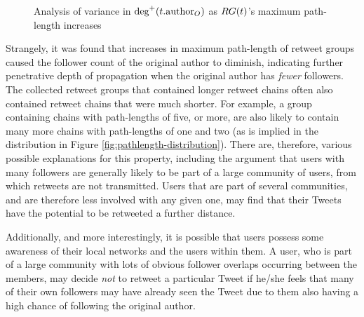 \begin{figure}[h]
\centering
    \caption{Analysis of variance in $\textrm{deg}^+(t.\textrm{author}_O)$ as $RG(t)$'s maximum path-length increases}
\label{fig:originalfollowers-pathlength}
\end{figure}



Strangely, it was found that increases in maximum path-length of retweet groups caused the follower count of the original author to diminish, indicating further penetrative depth of propagation when the original author has \textit{fewer} followers. The collected retweet groups that contained longer retweet chains often also contained retweet chains that were much shorter. For example, a group containing chains with path-lengths of five, or more, are also likely to contain many more chains with path-lengths of one and two (as is implied in the distribution in Figure \ref{fig:pathlength-distribution}). There are, therefore, various possible explanations for this property, including the argument that users with many followers are generally likely to be part of a large community of users, from which retweets are not transmitted. Users that are part of several communities, and are therefore less involved with any given one, may find that their Tweets have the potential to be retweeted a further distance.

Additionally, and more interestingly, it is possible that users possess some awareness of their local networks and the users within them. A user, who is part of a large community with lots of obvious follower overlaps occurring between the members, may decide \textit{not} to retweet a particular Tweet if he/she feels that many of their own followers may have already seen the Tweet due to them also having a high chance of following the original author.

